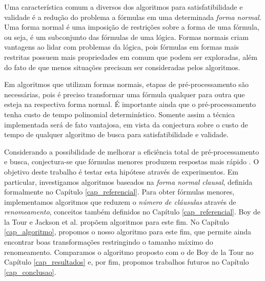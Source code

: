 Uma característica comum a diversos dos algoritmos para satisfatibilidade e validade é a redução do problema a fórmulas em uma determinada \emph{forma normal}. Uma forma normal é uma imposição de restrições sobre a forma de uma fórmula, ou seja, é um subconjunto das fórmulas de uma lógica. Formas normais criam vantagens ao lidar com problemas da lógica, pois fórmulas em formas mais restritas possuem mais propriedades em comum que podem ser exploradas, além do fato de que menos situações precisam ser consideradas pelos algoritmos.

Em algoritmos que utilizam formas normais, etapas de pré-processamento são necessárias, pois é preciso transformar uma fórmula qualquer para outra que esteja na respectiva forma normal. É importante ainda que o pré-processamento tenha custo de tempo polinomial determinístico. Somente assim a técnica implementada será de fato vantajosa, em vista da conjectura sobre o custo de tempo de qualquer algoritmo de busca para satisfatibilidade e validade.

Considerando a possibilidade de melhorar a eficiência total de pré-processamento e busca, conjectura-se que fórmulas menores produzem respostas mais rápido \cite{nonnengart2001computing}. O objetivo deste trabalho é testar esta hipótese através de experimentos. Em particular, investigamos algoritmos baseados na \emph{forma normal clausal}, definida formalmente no Capítulo \ref{cap_referencial}. Para obter fórmulas menores, implementamos algoritmos que reduzem o \emph{número de cláusulas} através de \emph{renomeamento}, conceitos também definidos no Capítulo \ref{cap_referencial}. Boy de la Tour \cite{de1992optimality} e Jackson et al. \cite{jackson2004clause} propõem algoritmos para este fim. No Capítulo \ref{cap_algoritmo}, propomos o nosso algoritmo para este fim, que permite ainda encontrar boas transformações restringindo o tamanho máximo do renomeamento. Comparamos o algoritmo proposto com o de Boy de la Tour no Capítulo \ref{cap_resultados} e, por fim, propomos trabalhos futuros no Capítulo \ref{cap_conclusao}.
